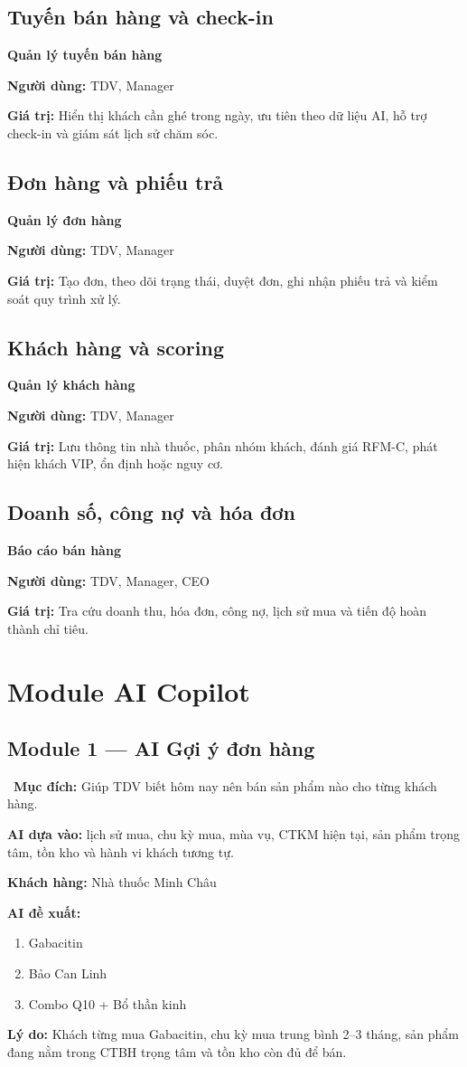 \documentclass[12pt,a4paper,oneside,openany]{book}
\newcommand{\screenpurpose}[1]{\begin{tcolorbox}[colback=medgreen!8,colframe=medgreen!55,left=6pt,right=6pt,top=4pt,bottom=4pt]\faFlag\ \textbf{Mục đích:} #1\end{tcolorbox}}
\newcommand{\modulecard}[3]{\begin{tcolorbox}[roleBox]\textbf{#1}\par\smallskip\textbf{Người dùng:} #2\par\textbf{Giá trị:} #3\end{tcolorbox}}
\begin{document}
\section{Tuyến bán hàng và check-in}
\modulecard{Quản lý tuyến bán hàng}{TDV, Manager}{Hiển thị khách cần ghé trong ngày, ưu tiên theo dữ liệu AI, hỗ trợ check-in và giám sát lịch sử chăm sóc.}

\section{Đơn hàng và phiếu trả}
\modulecard{Quản lý đơn hàng}{TDV, Manager}{Tạo đơn, theo dõi trạng thái, duyệt đơn, ghi nhận phiếu trả và kiểm soát quy trình xử lý.}

\section{Khách hàng và scoring}
\modulecard{Quản lý khách hàng}{TDV, Manager}{Lưu thông tin nhà thuốc, phân nhóm khách, đánh giá RFM-C, phát hiện khách VIP, ổn định hoặc nguy cơ.}

\section{Doanh số, công nợ và hóa đơn}
\modulecard{Báo cáo bán hàng}{TDV, Manager, CEO}{Tra cứu doanh thu, hóa đơn, công nợ, lịch sử mua và tiến độ hoàn thành chỉ tiêu.}

\chapter{Module AI Copilot}

\section{Module 1 — AI Gợi ý đơn hàng}
\screenpurpose{Giúp TDV biết hôm nay nên bán sản phẩm nào cho từng khách hàng.}
\textbf{AI dựa vào:} lịch sử mua, chu kỳ mua, mùa vụ, CTKM hiện tại, sản phẩm trọng tâm, tồn kho và hành vi khách tương tự.

\begin{tcolorbox}[exBox]
\textbf{Khách hàng:} Nhà thuốc Minh Châu

\textbf{AI đề xuất:}
\begin{enumerate}
  \item Gabacitin
  \item Bảo Can Linh
  \item Combo Q10 + Bổ thần kinh
\end{enumerate}

\textbf{Lý do:} Khách từng mua Gabacitin, chu kỳ mua trung bình 2--3 tháng, sản phẩm đang nằm trong CTBH trọng tâm và tồn kho còn đủ để bán.
\end{tcolorbox}
\end{document}
